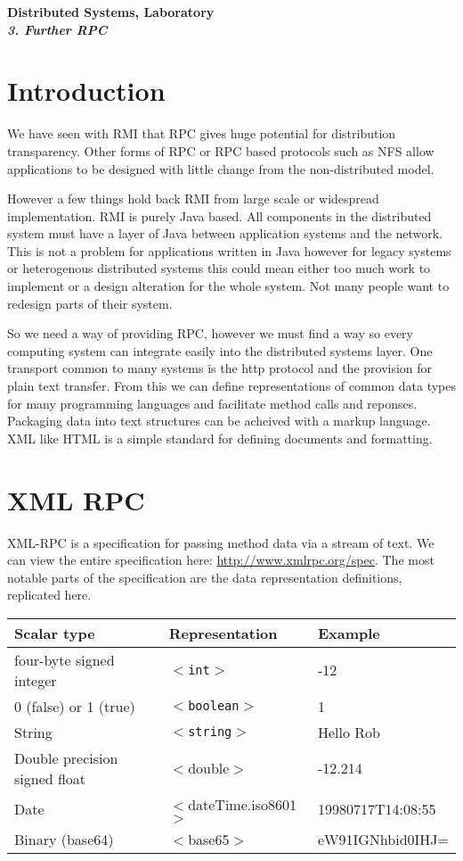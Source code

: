 \documentclass[12pt,a4paper]{article}
\begin{document}
\thispagestyle{empty}
\begin{center}
{\textbf{\Huge Distributed Systems, Laboratory}}\\
{\textit{\textbf{\Large 3. Further RPC}}}
\end{center}

\section*{Introduction}
We have seen with RMI that RPC gives huge potential for distribution transparency. Other forms of RPC or RPC based protocols such as NFS allow applications to be designed with little change from the non-distributed model.

However a few things hold back RMI from large scale or widespread implementation. RMI is purely Java based. All components in the distributed system must have a layer of Java between application systems and the network. This is not a problem for applications written in Java however for legacy systems or heterogenous distributed systems this could mean either too much work to implement or a design alteration for the whole system. Not many people want to redesign parts of their system.

So we need a way of providing RPC, however we must find a way so every computing system can integrate easily into the distributed systems layer. One transport common to many systems is the http protocol and the provision for plain text transfer.  From this we can define representations of common data types for many programming languages and facilitate method calls and reponses. Packaging data into text structures can be acheived with a markup language. XML like HTML is a simple standard for defining documents and formatting. 
\section*{XML RPC}
XML-RPC is a specification for passing method data via a stream of text. We can view the entire specification here:  \url{http://www.xmlrpc.org/spec}. 
The most notable parts of the specification are the data representation definitions, replicated here.
\begin{center}
\begin{tabular}{|l|l|l|}
\hline
Scalar type & Representation & Example\\
\hline
\hline
four-byte signed integer & {\tt $<$int$>$} & -12\\
0 (false) or 1 (true) & {\tt $<$boolean$>$ } & 1 \\
String & {\tt $<$string$>$} & Hello Rob \\
Double precision signed float & $<$double$>$ & -12.214 \\
Date &  $<$dateTime.iso8601$>$ & 19980717T14:08:55 \\
Binary (base64) & $<$base65$>$ & eW91IGNhbid0IHJ= \\
\hline
\end{tabular}
\end{center}
\end{document}

